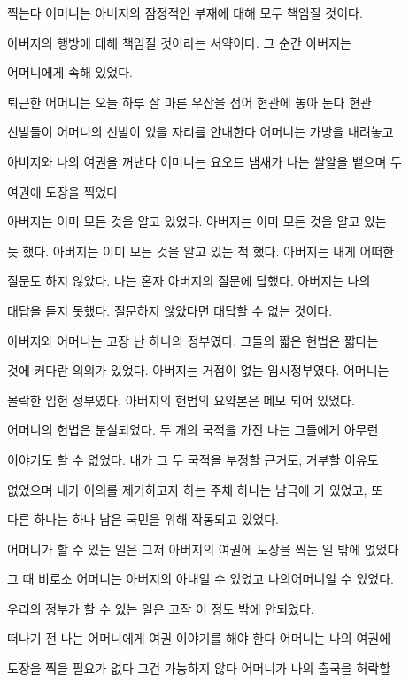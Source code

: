찍는다 어머니는 아버지의 잠정적인 부재에 대해 모두 책임질 것이다.

아버지의 행방에 대해 책임질 것이라는 서약이다. 그 순간 아버지는

어머니에게 속해 있었다.



퇴근한 어머니는 오늘 하루 잘 마른 우산을 접어 현관에 놓아 둔다 현관

신발들이 어머니의 신발이 있을 자리를 안내한다 어머니는 가방을 내려놓고

아버지와 나의 여권을 꺼낸다 어머니는 요오드 냄새가 나는 쌀알을 뱉으며 두

여권에 도장을 찍었다



아버지는 이미 모든 것을 알고 있었다. 아버지는 이미 모든 것을 알고 있는

듯 했다. 아버지는 이미 모든 것을 알고 있는 척 했다. 아버지는 내게 어떠한

질문도 하지 않았다. 나는 혼자 아버지의 질문에 답했다. 아버지는 나의

대답을 듣지 못했다. 질문하지 않았다면 대답할 수 없는 것이다.



아버지와 어머니는 고장 난 하나의 정부였다. 그들의 짧은 헌법은 짧다는

것에 커다란 의의가 있었다. 아버지는 거점이 없는 임시정부였다. 어머니는

몰락한 입헌 정부였다. 아버지의 헌법의 요약본은 메모 되어 있었다.

어머니의 헌법은 분실되었다. 두 개의 국적을 가진 나는 그들에게 아무런

이야기도 할 수 없었다. 내가 그 두 국적을 부정할 근거도, 거부할 이유도

없었으며 내가 이의를 제기하고자 하는 주체 하나는 남극에 가 있었고, 또

다른 하나는 하나 남은 국민을 위해 작동되고 있었다.



어머니가 할 수 있는 일은 그저 아버지의 여권에 도장을 찍는 일 밖에 없었다

그 때 비로소 어머니는 아버지의 아내일 수 있었고 나의어머니일 수 있었다.



우리의 정부가 할 수 있는 일은 고작 이 정도 밖에 안되었다.



떠나기 전 나는 어머니에게 여권 이야기를 해야 한다 어머니는 나의 여권에

도장을 찍을 필요가 없다 그건 가능하지 않다 어머니가 나의 출국을 허락할

